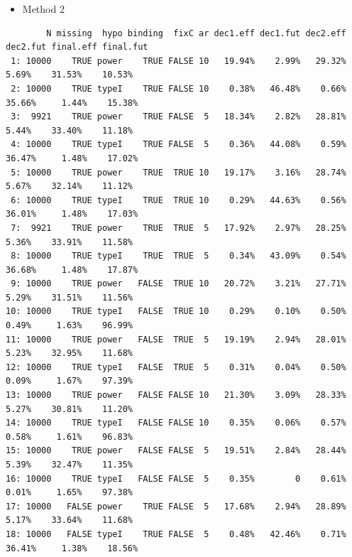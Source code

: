 \documentclass[12pt]{article}
\begin{document}
\begin{itemize}
\item Method 2
\end{itemize}
\begin{verbatim}
        N missing  hypo binding  fixC ar dec1.eff dec1.fut dec2.eff dec2.fut final.eff final.fut
 1: 10000    TRUE power    TRUE FALSE 10   19.94%    2.99%   29.32%    5.69%    31.53%    10.53%
 2: 10000    TRUE typeI    TRUE FALSE 10    0.38%   46.48%    0.66%   35.66%     1.44%    15.38%
 3:  9921    TRUE power    TRUE FALSE  5   18.34%    2.82%   28.81%    5.44%    33.40%    11.18%
 4: 10000    TRUE typeI    TRUE FALSE  5    0.36%   44.08%    0.59%   36.47%     1.48%    17.02%
 5: 10000    TRUE power    TRUE  TRUE 10   19.17%    3.16%   28.74%    5.67%    32.14%    11.12%
 6: 10000    TRUE typeI    TRUE  TRUE 10    0.29%   44.63%    0.56%   36.01%     1.48%    17.03%
 7:  9921    TRUE power    TRUE  TRUE  5   17.92%    2.97%   28.25%    5.36%    33.91%    11.58%
 8: 10000    TRUE typeI    TRUE  TRUE  5    0.34%   43.09%    0.54%   36.68%     1.48%    17.87%
 9: 10000    TRUE power   FALSE  TRUE 10   20.72%    3.21%   27.71%    5.29%    31.51%    11.56%
10: 10000    TRUE typeI   FALSE  TRUE 10    0.29%    0.10%    0.50%    0.49%     1.63%    96.99%
11: 10000    TRUE power   FALSE  TRUE  5   19.19%    2.94%   28.01%    5.23%    32.95%    11.68%
12: 10000    TRUE typeI   FALSE  TRUE  5    0.31%    0.04%    0.50%    0.09%     1.67%    97.39%
13: 10000    TRUE power   FALSE FALSE 10   21.30%    3.09%   28.33%    5.27%    30.81%    11.20%
14: 10000    TRUE typeI   FALSE FALSE 10    0.35%    0.06%    0.57%    0.58%     1.61%    96.83%
15: 10000    TRUE power   FALSE FALSE  5   19.51%    2.84%   28.44%    5.39%    32.47%    11.35%
16: 10000    TRUE typeI   FALSE FALSE  5    0.35%        0    0.61%    0.01%     1.65%    97.38%
17: 10000   FALSE power    TRUE FALSE  5   17.68%    2.94%   28.89%    5.17%    33.64%    11.68%
18: 10000   FALSE typeI    TRUE FALSE  5    0.48%   42.46%    0.71%   36.41%     1.38%    18.56%
\end{verbatim}

\clearpage
\end{document}
